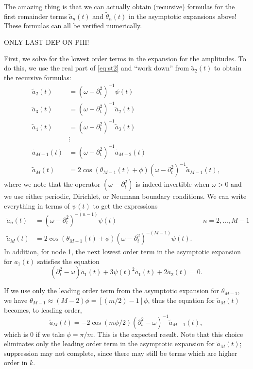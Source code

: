 \documentclass[11pt,reqno]{amsart}
\begin{document}
The amazing thing is that we can actually obtain (recursive) formulas for the first remainder terms $\tilde{a}_n(t)$ and $\tilde{\theta}_n(t)$ in the asymptotic expansions above! These formulas can all be verified numerically. 

ONLY LAST DEP ON PHI!

First, we solve for the lowest order terms in the expansion for the amplitudes. To do this, we use the real part of \cref{eq:st2} and ``work down'' from $\tilde{a}_2(t)$ to obtain the recursive formulas:
\begin{align*}
\tilde{a}_2(t) &= (\omega - \partial_t^2)^{-1} \psi(t) \\
\tilde{a}_3(t) &= (\omega - \partial_t^2)^{-1} \tilde{a}_2(t) \\
\tilde{a}_4(t) &= (\omega - \partial_t^2)^{-1} \tilde{a}_3(t) \\
&\vdots \\
\tilde{a}_{M-1}(t) &= (\omega - \partial_t^2)^{-1} \tilde{a}_{M-2}(t) \\
\tilde{a}_{M}(t) &= 2 \cos( \theta_{M-1}(t) + \phi )(\omega - \partial_t^2)^{-1} \tilde{a}_{M-1}(t),
\end{align*}
where we note that the operator $(\omega - \partial_t^2)$ is indeed invertible when $\omega > 0$ and we use either periodic, Dirichlet, or Neumann boundary conditions. We can write everything in terms of $\psi(t)$ to get the expressions
\begin{align*}
\tilde{a}_n(t)   &= (\omega - \partial_t^2)^{-(n-1)} \psi(t) && n = 2, \dots, M-1 \\
\tilde{a}_{M}(t) &= 2 \cos( \theta_{M-1}(t) + \phi )(\omega - \partial_t^2)^{-(M-1)} \psi(t).
\end{align*}
In addition, for node 1, the next lowest order term in the asymptotic expansion for $a_1(t)$ satisfies the equation
\[
(\partial_t^2 - \omega)\tilde{a}_1(t) + 3 \psi(t)^2 \tilde{a}_1(t) + 2 \tilde{a}_2(t) = 0.
\]

If we use only the leading order term from the asymptotic expansion for $\theta_{M-1}$, we have $\theta_{M-1} \approx (M-2) \phi = [(m/2)-1] \phi$, thus the equation for $\tilde{a}_{M}(t)$ becomes, to leading order,
\[
\tilde{a}_{M}(t) = -2 \cos( m \phi/2 )(\partial_t^2 - \omega)^{-1} \tilde{a}_{M-1}(t),
\]
which is 0 if we take $\phi = \pi/m$. This is the expected result. Note that this choice eliminates only the leading order term in the asymptotic expansion for $\tilde{a}_{M}(t)$; suppression may not complete, since there may still be terms which are higher order in $k$.
\end{document}
